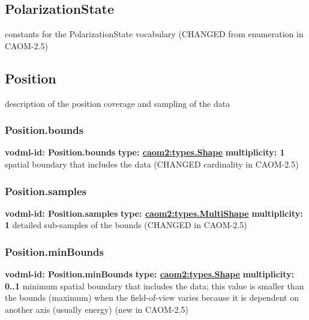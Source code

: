   \subsection{PolarizationState}
  \label{sect:PolarizationState}
    constants for the PolarizationState vocabulary (CHANGED from enumeration in CAOM-2.5)

  \subsection{Position}
  \label{sect:Position}
    description of the position coverage and sampling of the data

    \subsubsection{Position.bounds}
      \textbf{vodml-id: Position.bounds} \newline
      \textbf{type: \hyperref[sect:types.Shape]{caom2:types.Shape}} \newline
      \textbf{multiplicity: 1} \newline
      spatial boundary that includes the data (CHANGED cardinality in CAOM-2.5)

    \subsubsection{Position.samples}
      \textbf{vodml-id: Position.samples} \newline
      \textbf{type: \hyperref[sect:types.MultiShape]{caom2:types.MultiShape}} \newline
      \textbf{multiplicity: 1} \newline
      detailed sub-samples of the bounds (CHANGED in CAOM-2.5)

    \subsubsection{Position.minBounds}
      \textbf{vodml-id: Position.minBounds} \newline
      \textbf{type: \hyperref[sect:types.Shape]{caom2:types.Shape}} \newline
      \textbf{multiplicity: 0..1} \newline
      minimum spatial boundary that includes the data; this value is smaller than the bounds (maximum) when the field-of-view varies because it is dependent on another axis (usually energy) (new in CAOM-2.5)

